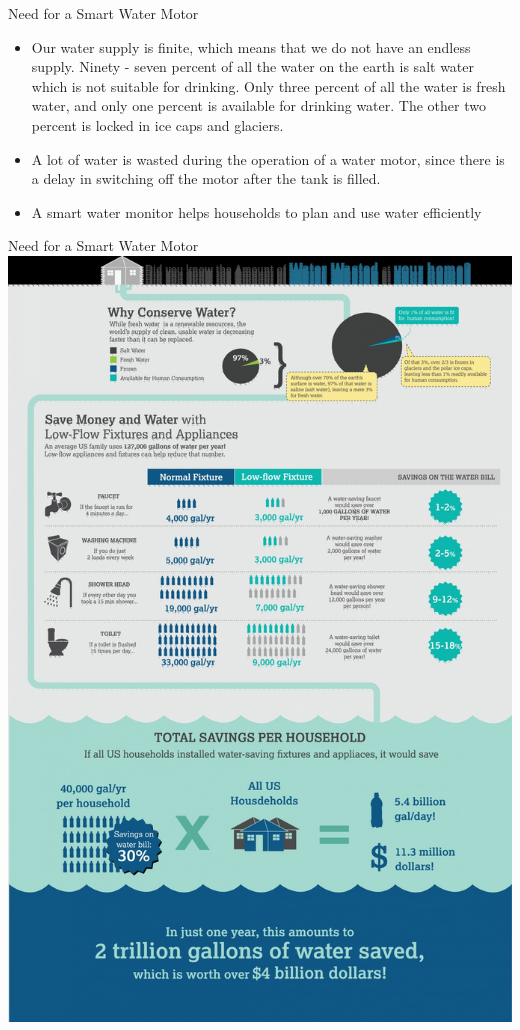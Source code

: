 \documentclass{beamer}
\begin{document}
     \begin{frame}{Need for a Smart Water Motor}
     \begin{itemize}
     
           \item Our water supply is finite, which means that we do not have an endless supply. Ninety - seven percent of all the water on the earth is salt water which is not suitable for drinking. Only three percent of all the water is fresh water, and only one percent is available for drinking water. The other two percent is locked in ice caps and glaciers.\break
           \item A lot of water is wasted during the operation of a water motor, since there is a delay in switching off the motor after the tank is filled.\break
           \item A smart water monitor helps households to plan and use water efficiently
    \end{itemize}
     \end{frame}
     \begin{frame}{Need for a Smart Water Motor}
     \centering
            \includegraphics[width=.5\textwidth,height=.9\textheight]{img/water.png}
     \end{frame}
         
\end{document}
